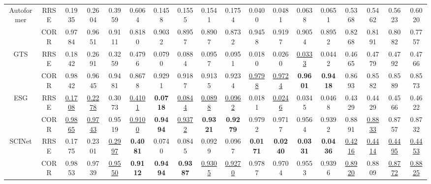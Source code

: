 \documentclass[final,12pt]{elsarticle}
\begin{document}
\begin{landscape}
\begin{table}[h]
\begin{subtable}[h]{0.48\textwidth}
\begin{center}
\begin{tabular}{|*{18}{c|}}
    \hline
    \multirow{2}{*}{Autoformer}  %
    & RRSE 
    & 0.1935 & 0.2604 & 0.3959 & 0.6064 
    & 0.1458 & 0.1555 & 0.1541 & 0.1754 
    & 0.0400 & 0.0481 & 0.0638 & 0.0651 
    & 0.5368 & 0.5462 & 0.5623 & 0.6020  \\
    \cline{2-18}
    & CORR 
    & 0.9784 & 0.9651 & 0.9111 & 0.8180 
    & 0.9032 & 0.8957 & 0.8907 & 0.8732 
    & 0.9458 & 0.9197 & 0.9054 & 0.8952 
    & 0.8268 & 0.8191 & 0.8082 & 0.7757  \\

    \hline
    \multirow{2}{*}{GTS}  %
    & RRSE 
    & 0.1842 & 0.2691 & 0.3259 & 0.4796 
    & 0.0790 & 0.0884 & 0.0957 & 0.0951 
    & 0.0180 & 0.0260 & \underline{0.0333} & 0.0442 
    & 0.4665 & 0.4779 & 0.4792 & 0.4766  \\
    \cline{2-18}
    & CORR 
    & 0.9842 & 0.9645 & 0.9481 & 0.8678 
    & 0.9291 & 0.9187 & 0.9135 & 0.9234 
    & \underline{0.9798} & \underline{0.9724} & \textbf{0.9601} & \textbf{0.9418} 
    & 0.8693 & 0.8582 & 0.8589 & 0.8573  \\

    \hline
    \multirow{2}{*}{ESG}  %
    & RRSE 
    & \underline{0.1708} & \underline{0.2278} & 0.3073 & \underline{0.4101} 
    & \textbf{0.0718} & \underline{0.0844} & \underline{0.0898} & \underline{0.0962} 
    & 0.0181 & \underline{0.0246} & 0.0345 & 0.0468 
    & 0.4329 & 0.4429 & 0.4566 & 0.4622  \\
    \cline{2-18}
    & CORR 
    & \underline{0.9865} & \underline{0.9743} & 0.9519 & \underline{0.9100} 
    & \textbf{0.9494} & \underline{0.9372} & \textbf{0.9321} & \textbf{0.9279} 
    & 0.9792 & 0.9717 & 0.9564 & 0.9392 
    & 0.8891 & \underline{0.8833} & 0.8757 & 0.8732  \\

    \hline
    \multirow{2}{*}{SCINet}  %
    & RRSE 
    & 0.1775 & 0.2301 & \underline{0.2997} & \textbf{0.4081} 
    & 0.0740 & 0.0845 & 0.0929 & 0.0967 
    & \textbf{0.0171} & \textbf{0.0240} & \textbf{0.0331} & \textbf{0.0436} 
    & \underline{0.4216} & \underline{0.4414} & \underline{0.4495} & \underline{0.4453}  \\
    \cline{2-18}
    & CORR 
    & 0.9853 & 0.9739 & \underline{0.9550} & \textbf{0.9112} 
    & \textbf{0.9494} & \textbf{0.9387} & \underline{0.9305} & \underline{0.9270} 
    & 0.9787 & 0.9704 & 0.9553 & 0.9396 
    & \underline{0.8920} & 0.8809 & \underline{0.8772} & \underline{0.8825}  \\


\end{tabular}
\end{center}
\end{subtable}
\end{table}
\end{landscape}
\end{document}
